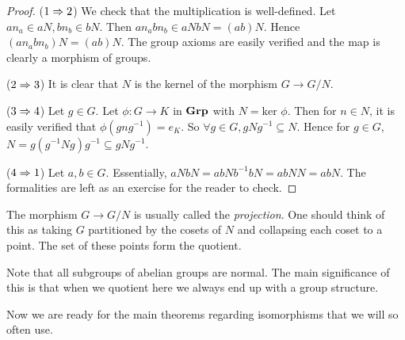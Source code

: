 \documentclass[../../book.tex]{subfiles}
\begin{document}
\begin{proof}
    ($1 \Rightarrow 2$) 
        We check that the multiplication is well-defined. 
        Let $an_a \in aN, bn_b \in bN$. 
        Then $an_abn_b \in aNbN = (ab)N$. 
        Hence $(an_abn_b)N = (ab)N$.
        The group axioms are easily verified
        and the map is clearly a morphism of groups.
        
    ($2 \Rightarrow 3$)
        It is clear that $N$ is the kernel of the morphism
        $G \to G/N$.
        
    ($3 \Rightarrow 4$)
        Let $g \in G$. 
        Let $\phi : G \to K$ in $\mathbf{Grp}$ with $N = \text{ker }\phi$.
        Then for $n \in N$, it is easily verified that $\phi(gng^{-1}) = e_K$. 
        So $\forall g \in G, gNg^{-1} \subseteq N$. 
        Hence for $g \in G$, $N = g(g^{-1}Ng)g^{-1} \subseteq gNg^{-1}$.
        
    ($4 \Rightarrow 1$)
        Let $a, b \in G$. 
        Essentially, $aNbN = abNb^{-1}bN = abNN = abN$. 
        The formalities are left as an exercise for the reader to check. 
        
\end{proof}

\begin{rmk}
    The morphism $G \to G/N$ is usually called the \emph{projection}. 
    One should think of this as taking $G$ partitioned by the cosets of $N$
    and collapsing each coset to a point. 
    The set of these points form the quotient. 
\end{rmk}

\begin{rmk}
    Note that all subgroups of abelian groups are normal. 
    The main significance of this is that 
    when we quotient here we always end up with a group structure.
\end{rmk}

Now we are ready for the main theorems regarding isomorphisms
that we will so often use. 
\end{document}
